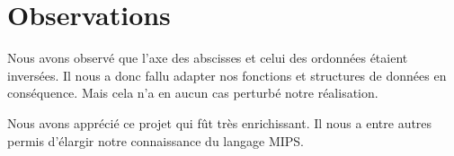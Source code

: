 \documentclass[a4paper]{article}
\begin{document}
\section{Observations}
Nous avons observé que l'axe des abscisses et celui des ordonnées étaient inversées. Il nous a donc fallu adapter nos fonctions et structures de données en conséquence.
Mais cela n'a en aucun cas perturbé notre réalisation.

Nous avons apprécié ce projet qui fût très enrichissant. Il nous a entre autres permis d'élargir notre connaissance du langage MIPS.
\end{document}
